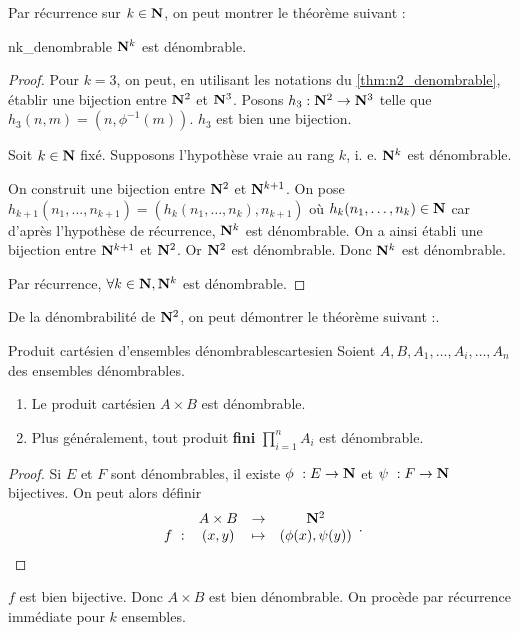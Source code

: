 \documentclass[a4paper,french,final]{memoir}
\begin{document}
Par récurrence sur $k \in \mathbf{N}$, on peut montrer le théorème suivant :
\begin{theoremb}{}{nk_denombrable}
    $\mathbf{N}^k$ est dénombrable.
\end{theoremb}

\begin{proof}

Pour $k = 3$, on peut, en utilisant les notations du \cref{thm:n2_denombrable}, établir une bijection entre $\mathbf{N}^2$ et $\mathbf{N}^3$. Posons $h_3 : \mathbf{N}^2 \to \mathbf{N}^3$ telle que $h_3(n,m) = (n,\phi^{-1}(m))$. $h_3$ est bien une bijection. 

Soit $k \in \mathbf{N}$ fixé. Supposons l'hypothèse vraie au rang $k$, i. e. $\mathbf{N}^k$ est dénombrable.

On construit une bijection entre $\mathbf{N}^2$ et $\mathbf{N}^{k+1}$. On pose $h_{k+1}(n_1, \dots, n_{k+1}) = (h_k(n_1, \dots, n_k),n_{k+1})$ où $h_k(n_1, \dots, n_k) \in \mathbf{N}$ car d'après l'hypothèse de récurrence, $\mathbf{N}^k$ est dénombrable. On a ainsi établi une bijection entre $\mathbf{N}^{k+1}$ et $\mathbf{N}^2$. Or $\mathbf{N}^2$ est dénombrable. Donc $\mathbf{N}^k$ est dénombrable. 

Par récurrence, $\forall k \in \mathbf{N}, \mathbf{N}^k$ est dénombrable. 

\end{proof}
De la dénombrabilité de $\mathbf{N}^2$, on peut démontrer le théorème suivant :. 
\begin{theoremb}{Produit cartésien d'ensembles dénombrables}{cartesien}
	Soient $A, B, A_1, \dots, A_i, \dots, A_n$ des ensembles dénombrables. 
	\begin{enumerate}
		\item Le produit cartésien $A \times B$ est dénombrable. 
		\item Plus généralement, tout produit \textbf{fini} $\prod_{i=1}^{n} A_i $ est dénombrable.
	\end{enumerate}
\end{theoremb}
\begin{proof}
	Si $E$ et $F$ sont dénombrables, il existe $\phi~: E \to \NN$ et $\psi~: F \to \mathbf{N}$ bijectives. On peut alors définir \[ \begin{array}{cccc}
	\ & A \times B & \to & \NN^2 \\
	f~: & (x,y) & \mapsto & (\phi(x), \psi(y))
	\end{array}.\]
	
\end{proof}

$f $ est bien bijective. Donc $A \times B$ est bien dénombrable. On procède par récurrence immédiate pour $k$ ensembles. 
\end{document}
